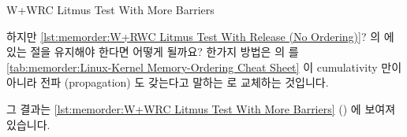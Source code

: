 \fi

\begin{listing}[tbp]

\caption{W+WRC Litmus Test With More Barriers}
\label{lst:memorder:W+WRC Litmus Test With More Barriers}
\end{listing}

\begin{fcvref}
하지만
\cref{lst:memorder:W+RWC Litmus Test With Release (No Ordering)}?
의  에 있는  절을 유지해야 한다면 어떻게 될까요?
한가지 방법은  의  를
\cref{tab:memorder:Linux-Kernel Memory-Ordering Cheat Sheet}
이 cumulativity 만이 아니라 전파 (propagation) 도 갖는다고 말하는 
로 교체하는 것입니다.
\end{fcvref}
그 결과는
\cref{lst:memorder:W+WRC Litmus Test With More Barriers}
() 에 보여져 있습니다.

